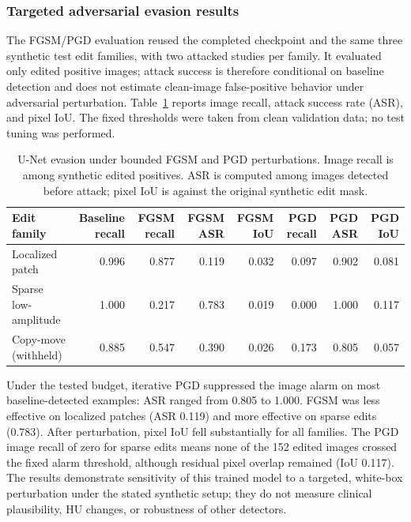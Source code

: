 \documentclass[journal]{IEEEtran}
\begin{document}
  \subsubsection{Targeted adversarial evasion results}
  The FGSM/PGD evaluation reused the completed checkpoint and the same three synthetic test edit families, with two attacked studies per family. It evaluated only edited positive images; attack success is therefore conditional on baseline detection and does not estimate clean-image false-positive behavior under adversarial perturbation. Table~\ref{tab:fgsm_pgd} reports image recall, attack success rate (ASR), and pixel IoU. The fixed thresholds were taken from clean validation data; no test tuning was performed.

  \begin{table}[t]
  \caption{U-Net evasion under bounded FGSM and PGD perturbations. Image recall is among synthetic edited positives. ASR is computed among images detected before attack; pixel IoU is against the original synthetic edit mask.}
  \label{tab:fgsm_pgd}
  \centering\scriptsize
  \begin{tabular}{lrrrrrrr}
  \toprule
  Edit family & Baseline recall & FGSM recall & FGSM ASR & FGSM IoU & PGD recall & PGD ASR & PGD IoU \\
  \midrule
  Localized patch & 0.996 & 0.877 & 0.119 & 0.032 & 0.097 & 0.902 & 0.081 \\
  Sparse low-amplitude & 1.000 & 0.217 & 0.783 & 0.019 & 0.000 & 1.000 & 0.117 \\
  Copy-move (withheld) & 0.885 & 0.547 & 0.390 & 0.026 & 0.173 & 0.805 & 0.057 \\
  \bottomrule
  \end{tabular}
  \end{table}

  Under the tested budget, iterative PGD suppressed the image alarm on most baseline-detected examples: ASR ranged from 0.805 to 1.000. FGSM was less effective on localized patches (ASR 0.119) and more effective on sparse edits (0.783). After perturbation, pixel IoU fell substantially for all families. The PGD image recall of zero for sparse edits means none of the 152 edited images crossed the fixed alarm threshold, although residual pixel overlap remained (IoU 0.117). The results demonstrate sensitivity of this trained model to a targeted, white-box perturbation under the stated synthetic setup; they do not measure clinical plausibility, HU changes, or robustness of other detectors.
  
\end{document}

